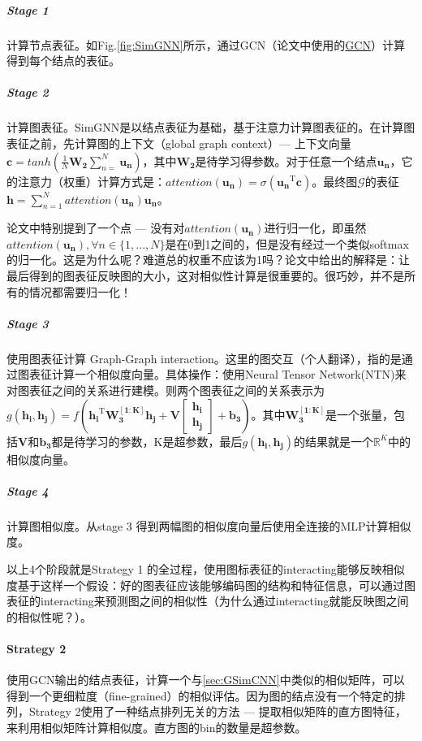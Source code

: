 \subparagraph{Stage 1}计算节点表征。如Fig.\ref{fig:SimGNN}所示，通过GCN（论文中使用的\href{https://github.com/mdeff/cnn_graph}{GCN}）计算得到每个结点的表征。

\subparagraph{Stage 2}计算图表征。SimGNN是以结点表征为基础，基于注意力计算图表征的。在计算图表征之前，先计算图的上下文（global  graph context）--- 上下文向量$\boldsymbol{c} = tanh(\frac{1}{N} \boldsymbol{W_2} \sum_{n=}^N \boldsymbol{u_n})$，其中$\boldsymbol{W_2}$是待学习得参数。对于任意一个结点$\boldsymbol{u_n}$，它的注意力（权重）计算方式是：$attention(\boldsymbol{u_n}) = \sigma( \boldsymbol{u_n}^\mathrm{T} \boldsymbol{c} )$。最终图$\mathcal{G}$的表征$\boldsymbol{h} = \sum_{n=1}^{N} attention(\boldsymbol{u_n}) \boldsymbol{u_n}$。

论文中特别提到了一个点 --- 没有对$attention(\boldsymbol{u_n})$进行归一化，即虽然$attention(\boldsymbol{u_n}), \forall n \in \{1, ... , N\}$是在0到1之间的，但是没有经过一个类似softmax的归一化。这是为什么呢？难道总的权重不应该为1吗？论文中给出的解释是：让最后得到的图表征反映图的大小，这对相似性计算是很重要的。很巧妙，{\color{red}并不是所有的情况都需要归一化}！
 
\subparagraph{Stage 3}使用图表征计算 Graph-Graph interaction。这里的图交互（个人翻译），指的是通过图表征计算一个相似度向量。具体操作：使用Neural Tensor Network(NTN)来对图表征之间的关系进行建模。则两个图表征之间的关系表示为$g(\boldsymbol{h_i}, \boldsymbol{h_j}) = f( \boldsymbol{h_i}^\mathrm{T} \boldsymbol{W_3^{[1:K] } } \boldsymbol{h_j} + \boldsymbol{V} \begin{bmatrix}
	\boldsymbol{h_i} \\ \boldsymbol{h_j}
\end{bmatrix} + \boldsymbol{b_3} )$。其中$\boldsymbol{W_3^{[1:K] } }$是一个张量，包括$\boldsymbol{V}和\boldsymbol{b_3}$都是待学习的参数，K是超参数，最后$g(\boldsymbol{h_i}, \boldsymbol{h_j})$的结果就是一个$\mathbb{R}^K$中的相似度向量。

\subparagraph{Stage 4}计算图相似度。从stage 3 得到两幅图的相似度向量后使用全连接的MLP计算相似度。
\newline

以上4个阶段就是Strategy 1 的全过程，使用图标表征的interacting能够反映相似度基于这样一个假设：好的图表征应该能够编码图的结构和特征信息，可以通过图表征的interacting来预测图之间的相似性（{\color{red}为什么通过interacting就能反映图之间的相似性呢？}）。

\paragraph{Strategy 2}使用GCN输出的结点表征，计算一个与\ref{sec:GSimCNN}中类似的相似矩阵，可以得到一个更细粒度（fine-grained）的相似评估。因为图的结点没有一个特定的排列，Strategy 2使用了一种结点排列无关的方法 --- 提取相似矩阵的直方图特征，来利用相似矩阵计算相似度。直方图的bin的数量是超参数。

